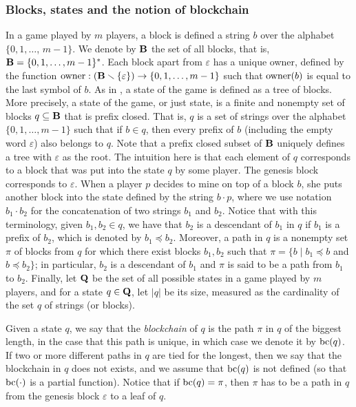 \subsubsection{Blocks, states and the notion of blockchain}\label{sub:states}

In a game played by $m$ players, a block is defined a string $b$ over the alphabet $\{0,1,\ldots$, $m-1\}$. We denote by $\mathbf{B}$ the set of all blocks, that is, $\mathbf{B} = \{0,1,\ldots , m-1\}^*$. Each block apart from $\varepsilon$ has a unique owner, defined by the function $\text{\rm owner}: (\mathbf{B} \smallsetminus \{\varepsilon\}) \rightarrow \{0,1, \ldots ,m-1\}$ such that $\text{\rm owner}(b)$ is equal to the last symbol of $b$. As in \cite{mininggames:2016}, a state of the game is defined as a tree of blocks. More precisely, a state of the game, or just state,  is a finite and nonempty set of blocks $q \subseteq \mathbf{B}$ that is prefix closed. That is, $q$ is a set of strings over the alphabet $\{0,1,\ldots, m-1\}$ such that if $b\in q$, then every prefix of $b$ (including the empty word $\varepsilon$) also belongs to $q$. Note that a prefix closed subset of $\mathbf{B}$ uniquely defines a tree with $\varepsilon$ as the root.
%
The intuition here is that each element of $q$ corresponds to a block that was put into the state $q$ by some player. The genesis block corresponds to $\varepsilon$. When a player $p$ decides to mine on top of a block $b$, she puts another block into the state defined by the string $b\cdot p$, where we use notation $b_1 \cdot b_2$ for the concatenation of two strings $b_1$ and $b_2$.
%
Notice that with this terminology, given $b_1, b_2 \in q$, we have that $b_2$ is a descendant of $b_1$ in $q$ if $b_1$ is a prefix of $b_2$, which is denoted by $b_1 \preceq b_2$. Moreover, a path in $q$ is a nonempty set $\pi$ of blocks from $q$ for which there exist blocks $b_1, b_2$ such that $\pi = \{ b \mid b_1 \preceq b$ and $b \preceq b_2\}$; in particular, $b_2$ is a descendant of $b_1$ and $\pi$ is said to be a path from $b_1$ to $b_2$.
Finally, let $\mathbf{Q}$ be the set of all possible states in a game played by $m$ players, and for a state $q \in \mathbf{Q}$, let $|q|$ be its size, measured as the cardinality of the set $q$ of strings (or blocks).

Given a state $q$, we say that the {\em blockchain} of $q$ is the path $\pi$ in $q$ of the biggest length, in the case that this path is unique, in which case we denote it by $\text{bc}(q)$. If two or more different paths in $q$ are tied for the longest, then we say that the blockchain in $q$ does not exists, and we assume that $\text{bc}(q)$ is not defined (so that $\text{bc}(\cdot)$ is a partial function).  Notice that if $\text{bc}(q) = \pi$, then $\pi$ has to be a path in $q$ from the genesis block $\varepsilon$ to a leaf of $q$.

